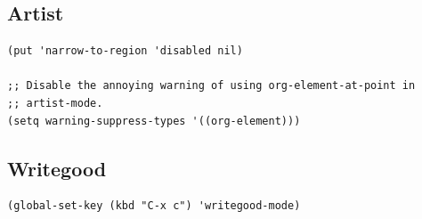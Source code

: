 \documentclass[10pt]{article}
\begin{document}
\subsection{Artist}
\label{sec:org63f76c6}
\begin{verbatim}
(put 'narrow-to-region 'disabled nil)

;; Disable the annoying warning of using org-element-at-point in
;; artist-mode.
(setq warning-suppress-types '((org-element)))
\end{verbatim}
\subsection{Writegood}
\label{sec:orge05fb5d}
\begin{verbatim}
(global-set-key (kbd "C-x c") 'writegood-mode)
\end{verbatim}
\end{document}

